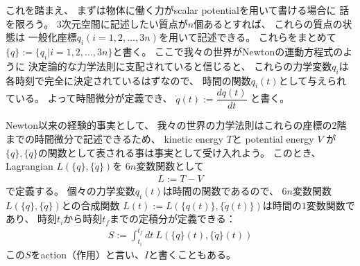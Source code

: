 これを踏まえ、
まずは物体に働く力がscalar potentialを用いて書ける場合に
話を限ろう。
3次元空間に記述したい質点が$n$個あるとすれば、
これらの質点の状態は
一般化座標$q_i$$(i=1,2,\dots,3n)$を用いて記述できる。
これらをまとめて$\{q\} := \{q_i| i=1,2,\dots,3n\}$と書く。
ここで我々の世界がNewtonの運動方程式のように
決定論的な力学法則に支配されていると信じると、
これらの力学変数$q_i$は各時刻で完全に決定されているはずなので、
時間の関数$q_i(t)$として与えられている。
よって時間微分が定義でき、
$\dot{q}(t) := \dfrac{dq(t)}{dt}$
と書く。

Newton以来の経験的事実として、
我々の世界の力学法則はこれらの座標の2階までの時間微分で記述できるため、
kinetic energy $T$と
potential energy $V$
が
$\{q\}, \{\dot{q}\}$の関数として表される事は事実として受け入れよう。
このとき、Lagrangian $L(\{q\}, \{\dot{q}\})$を
$6n$変数関数として
\begin{align}
  L := T - V
\end{align}
で定義する。
個々の力学変数$q_i(t)$は時間の関数であるので、
$6n$変数関数
$L(\{q\}, \{\dot{q}\})$との合成関数
$L(t) := L(\{q(t)\}, \{\dot{q}(t)\})$は時間の$1$変数関数であり、
時刻$t_i$から時刻$t_f$までの定積分が定義できる：
\begin{align}
  S := \int_{t_i}^{t_f}dt\ L(\{q\}(t), \{\dot{q}\}(t))
\end{align}
この$S$をaction（作用）と言い、$I$と書くこともある。

